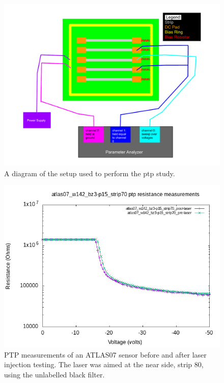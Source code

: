 \documentclass{report}
\begin{document}
            \begin{figure}[h] 
                \includegraphics[height=0.9\textwidth]{ptp_diagram}
                \centering
                \caption{ A diagram of the setup used to perform the ptp study. }
                \label{fig:ptp_diagram}
            \end{figure}

            \begin{figure}[h] 
                \includegraphics[height=.4\textheight]{atlas07_w142_bz3-p15_strip70_resistance_plots}
                \centering
                \caption{ PTP measurements of an ATLAS07 sensor before and after laser injection testing. The laser was aimed at the near side, strip 80, using the unlabelled black filter. }
                \label{fig:atlas07_w142_bz3-p15_strip70_resistance_plots}
            \end{figure}
\end{document}
